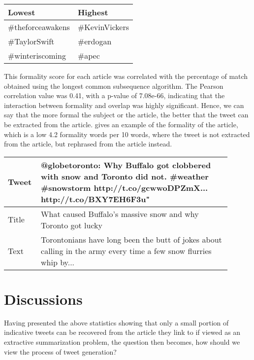 \begin{table}[htbp]
\centering
\begin{tabular}{|l|l|}
\hline
Lowest  & Highest  \\ \hline
\#theforceawakens       & \#KevinVickers           \\
\#TaylorSwift           & \#erdogan                \\
\#winteriscoming        & \#apec                  \\ \hline
\end{tabular}
\label{tab:formal}
\end{table}

This formality score for each article was correlated with the percentage of match obtained using the longest common subsequence algorithm. The Pearson correlation value was 0.41, with a p-value of 7.08e-66, indicating that the interaction between formality and overlap was highly significant. Hence, we can say that the more formal the subject or the article, the better that the tweet can be extracted from the article.  gives an example of the formality of the article, which is a low 4.2 formality words per 10 words, where the tweet is not extracted from the article, but rephrased from the article instead.

\begin{table}[htbp]
\centering
\begin{tabular}{|p{0.1\linewidth}|p{0.8\linewidth}|}
\hline
Tweet &  @globetoronto: Why Buffalo got clobbered with snow and Toronto did not. \#weather \#snowstorm http://t.co/gcwwoDPZmX... http://t.co/BXY7EH6F3u" \\ \hline
Title & What caused Buffalo’s massive snow and why Toronto got lucky \\  \hline
Text  & Torontonians have long been the butt of jokes about calling in the army every time a few snow flurries whip by... \\ \hline
\end{tabular}
\label{tab:formal}
\end{table}

\section{Discussions}
Having presented the above statistics showing that only a small portion of indicative tweets can be recovered from the article they link to if viewed as an extractive summarization problem, the question then becomes, how should we view the process of tweet generation?

